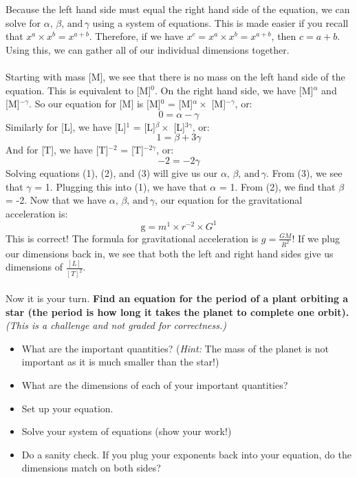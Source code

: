 \documentclass[11pt]{article}
\begin{document}
Because the left hand side must equal the right hand side of the equation, we can solve for $\alpha, \, \beta, \, \mathrm{and} \, \gamma$ using a system of equations.  This is made easier if you recall that $x^a \times x^b = x^{a+b}$.  Therefore, if we have $x^c = x^a \times x^b = x^{a+b}$, then $c = a+b$.  Using this, we can gather all of our individual dimensions together.
\\ \\ \noindent
Starting with mass [M], we see that there is no mass on the left hand side of the equation.  This is equivalent to [M]$^0$.  On the right hand side, we have [M]$^\alpha$ and [M]$^{-\gamma}$.  So our equation for [M] is [M]$^0$ = [M]$^\alpha \times$ [M]$^{-\gamma}$, or:
\begin{equation}
    0 = \alpha -\gamma
\end{equation}
Similarly for [L], we have [L]$^1$ = [L]$^\beta \times$ [L]$^{3\gamma}$, or:
\begin{equation}
    1 = \beta + 3\gamma
\end{equation}
And for [T], we have [T]$^{-2}$ = [T]$^{-2\gamma}$, or:
\begin{equation}
    -2 = -2\gamma
\end{equation}
Solving equations (1), (2), and (3) will give us our $\alpha, \, \beta, \, \mathrm{and} \, \gamma$.  From (3), we see that $\gamma$ = 1.  Plugging this into (1), we have that $\alpha$ = 1. From (2), we find that $\beta$ = -2.  Now that we have $\alpha, \, \beta, \, \mathrm{and} \, \gamma$, our equation for the gravitational acceleration is:
$$\mathrm{g} = m^1 \times r^{-2} \times G^1$$
This is correct! The formula for gravitational acceleration is $g = \frac{GM}{R^2}$!  If we plug our dimensions back in, we see that both the left and right hand sides give us dimensions of $\frac{[L]}{[T]^2}$.
\\ \\ \noindent
Now it is your turn.  \textbf{Find an equation for the period of a plant orbiting a star (the period is how long it takes the planet to complete one orbit).} \textit{(This is a challenge and not graded for correctness.)}
\begin{itemize}
    \item What are the important quantities? (\textit{Hint:} The mass of the planet is not important as it is much smaller than the star!)
    \item What are the dimensions of each of your important quantities?
    \item Set up your equation.
    \item Solve your system of equations (show your work!)
    \item Do a sanity check. If you plug your exponents back into your equation, do the dimensions match on both sides?
\end{itemize}
\end{document}

